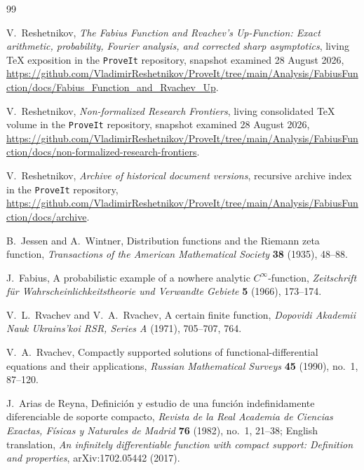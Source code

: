 \documentclass[11pt,oneside]{article}
\numberwithin{equation}{section}
\theoremstyle{definition}
\theoremstyle{remark}
\begin{document}
\begin{thebibliography}{99}

V.~Reshetnikov,
\newblock \emph{The Fabius Function and Rvachev's Up-Function: Exact arithmetic,
probability, Fourier analysis, and corrected sharp asymptotics},
\newblock living TeX exposition in the \texttt{ProveIt} repository, snapshot examined
28 August 2026,
\newblock \url{https://github.com/VladimirReshetnikov/ProveIt/tree/main/Analysis/FabiusFunction/docs/Fabius_Function_and_Rvachev_Up}.

V.~Reshetnikov,
\newblock \emph{Non-formalized Research Frontiers},
\newblock living consolidated TeX volume in the \texttt{ProveIt} repository, snapshot
examined 28 August 2026,
\newblock \url{https://github.com/VladimirReshetnikov/ProveIt/tree/main/Analysis/FabiusFunction/docs/non-formalized-research-frontiers}.

V.~Reshetnikov,
\newblock \emph{Archive of historical document versions},
\newblock recursive archive index in the \texttt{ProveIt} repository,
\newblock \url{https://github.com/VladimirReshetnikov/ProveIt/tree/main/Analysis/FabiusFunction/docs/archive}.

B.~Jessen and A.~Wintner,
\newblock Distribution functions and the Riemann zeta function,
\newblock \emph{Transactions of the American Mathematical Society} \textbf{38}
(1935), 48--88.

J.~Fabius,
\newblock A probabilistic example of a nowhere analytic $C^\infty$-function,
\newblock \emph{Zeitschrift f\"ur Wahrscheinlichkeitstheorie und Verwandte Gebiete}
\textbf{5} (1966), 173--174.

V.~L.~Rvachev and V.~A.~Rvachev,
\newblock A certain finite function,
\newblock \emph{Dopovidi Akademii Nauk Ukrains'koi RSR, Series A} (1971),
705--707, 764.

V.~A.~Rvachev,
\newblock Compactly supported solutions of functional-differential equations and their
applications,
\newblock \emph{Russian Mathematical Surveys} \textbf{45} (1990), no.~1, 87--120.

J.~Arias de Reyna,
\newblock Definici\'on y estudio de una funci\'on indefinidamente diferenciable de
soporte compacto,
\newblock \emph{Revista de la Real Academia de Ciencias Exactas, F\'isicas y Naturales
de Madrid} \textbf{76} (1982), no.~1, 21--38;
English translation, \emph{An infinitely differentiable function with compact support:
Definition and properties}, arXiv:1702.05442 (2017).


\end{thebibliography}
\end{document}
